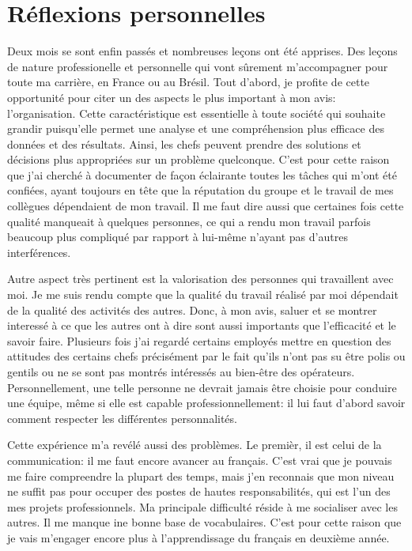 \documentclass{article}
\begin{document}
\newpage

\section{Réflexions personnelles}

Deux mois se sont enfin passés et nombreuses leçons ont été apprises. Des leçons
de nature professionelle et personnelle  qui vont sûrement m'accompagner pour
toute ma carrière, en France ou au Brésil. Tout d'abord, je profite de 
cette opportunité pour citer un des aspects le plus important à mon avis:
l'organisation. Cette caractéristique est essentielle à toute société qui
souhaite grandir puisqu'elle permet une analyse et une compréhension plus
efficace des données et des résultats. Ainsi, les chefs peuvent prendre des
solutions et décisions plus appropriées sur un problème quelconque. C'est pour
cette raison que j'ai cherché à documenter de façon éclairante toutes
les tâches qui m'ont été confiées, ayant toujours en tête que la réputation du
groupe et le travail de mes collègues dépendaient de mon travail. Il me
faut dire aussi que certaines fois cette qualité manqueait à quelques personnes, ce qui
a rendu mon travail parfois beaucoup plus compliqué par rapport à lui-même
n'ayant pas d'autres interférences.

\vspace{12pt}

Autre aspect très pertinent est la valorisation des personnes qui travaillent
avec moi. Je me suis rendu compte que la qualité du travail réalisé par moi
dépendait de la qualité des activités des autres. Donc, à mon avis, saluer et
se montrer interessé à ce que les autres ont à dire sont aussi importants que
l'efficacité et le savoir faire. Plusieurs fois j'ai regardé certains employés
mettre en question des attitudes des certains chefs précisément par le fait
qu'ils n'ont pas su être polis ou gentils ou ne se sont pas montrés intéressés
au bien-être des opérateurs. Personnellement, une telle personne ne devrait
jamais être choisie pour conduire une équipe, même si elle est capable 
professionnellement: il lui faut d'abord savoir comment respecter les
différentes personnalités. 

\vspace{12pt}

Cette expérience m'a revélé aussi des problèmes. Le premièr, il est celui de la
communication: il me faut encore avancer au français. C'est vrai que je
pouvais me faire compreendre la plupart des temps, mais j'en reconnais que mon
niveau ne suffit pas pour occuper des postes de hautes responsabilités, qui est
l'un des mes projets professionnels. Ma principale difficulté réside à me
socialiser avec les autres. Il me manque ine bonne base de vocabulaires.
C'est pour cette raison que je vais m'engager encore plus à l'apprendissage du
français en deuxième année.
\end{document}
